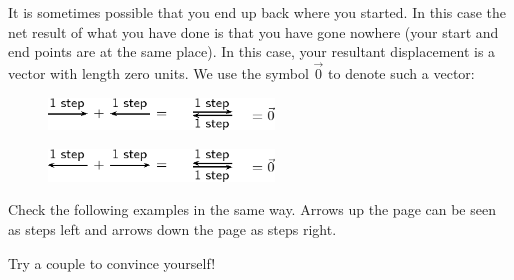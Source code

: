         \label{m38813*id186684}It is sometimes possible that you end up back where you started. In this case the net result of what you have done is that you have gone nowhere
(your start and end points are at the same place). In this case, your resultant displacement is a vector with length zero units. We use the symbol $\stackrel{\to }{0}$ to denote such a vector:\par 
        \label{m38813*id186706}
    \setcounter{subfigure}{0}
	\begin{figure}[H] %
    \begin{center}
    \label{m38813*id186710!!!underscore!!!media}\label{m38813*id186710!!!underscore!!!printimage}\includegraphics[width=6cm]{col11305.imgs/m38813_PG11C1_016.png} %
      \vspace{2pt}
    \vspace{.1in}
    \end{center}
 \end{figure}       
        \par 
        \label{m38813*id186716}
    \setcounter{subfigure}{0}
	\begin{figure}[H] %
    \begin{center}
    \label{m38813*id188625!!!underscore!!!media}\label{m38813*id188625!!!underscore!!!printimage}\includegraphics[width=6cm]{col11305.imgs/m38813_PG11C1_017.png} %
      \vspace{2pt}
    \vspace{.1in}
    \end{center}
 \end{figure}       
        \par 
        \label{m38813*id188632}Check the following examples in the same way. Arrows up the page can be
seen as steps left and arrows down the page as steps right.\par 
        \label{m38813*id188636}Try a couple to convince yourself!\par \nopagebreak
